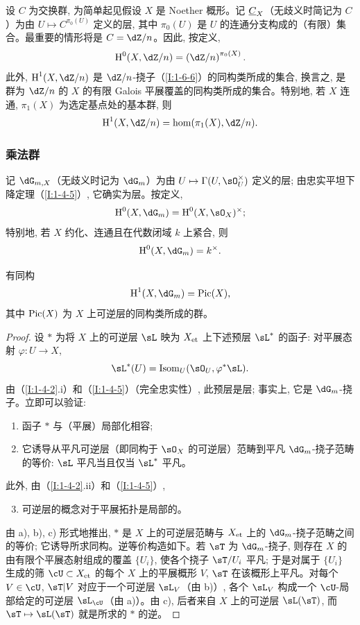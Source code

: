 设 $C$ 为交换群, 为简单起见假设 $X$ 是 Noether 概形。记 $\underline{C}_X$（无歧义时简记为 $C$）为由 $U\mapsto C^{\pi_0(U)}$ 定义的层, 其中 $\pi_0(U)$ 是 $U$ 的连通分支构成的（有限）集合。最重要的情形将是 $C=\dZ/n$。因此, 按定义,
\[
  \h^0(X,\dZ/n)=\left(\dZ/n\right)^{\pi_0(X)}\text{.}
\]
此外, $\h^1(X,\dZ/n)$ 是 $\dZ/n$-挠子（\ref{I:1-6-6}）的同构类所成的集合, 换言之, 是群为 $\dZ/n$ 的 $X$ 的有限 Galois 平展覆盖的同构类所成的集合。特别地, 若 $X$ 连通, $\pi_1(X)$ 为选定基点处的基本群, 则
\[
  \h^1(X,\dZ/n) = \hom(\pi_1(X),\dZ/n)\text{.}
\]

\subsubsection{乘法群}\label{I:2-2-2}

记 $\dG_{m,X}$（无歧义时记为 $\dG_m$）为由 $U\mapsto\Gamma(U,\sO_U^\times)$ 定义的层; 由忠实平坦下降定理（\ref{I:1-4-5}）, 它确实为层。按定义,
\[
  \h^0(X,\dG_m) = \h^0(X,\sO_X)^\times\text{;}
\]
特别地, 若 $X$ 约化、连通且在代数闭域 $k$ 上紧合, 则
\[
  \h^0(X,\dG_m) = k^\times\text{.}
\]

\begin{proposition}\label{I:2-2-3}
有同构
\[
  \h^1(X,\dG_m) = \pic(X)\text{,}
\]
其中 $\operatorname{Pic}(X)$ 为 $X$ 上可逆层的同构类所成的群。
\end{proposition}
\begin{proof}
设 $*$ 为将 $X$ 上的可逆层 $\sL$ 映为 ${X}_{\textnormal{et}}$ 上下述预层 $\sL^*$ 的函子: 对平展态射 $\varphi:U\to X$,
\[
  \sL^*(U)=\operatorname{Isom}_U(\sO_U,\varphi^*\sL)\text{.}
\]
由（\ref{I:1-4-2}.i）和（\ref{I:1-4-5}）（完全忠实性）, 此预层是层; 事实上, 它是 $\dG_m$-挠子。立即可以验证:
\begin{enumerate}[\indent a)]
  \item 函子 $*$ 与（平展）局部化相容;
  \item 它诱导从平凡可逆层（即同构于 $\sO_X$ 的可逆层）范畴到平凡 $\dG_m$-挠子范畴的等价: $\sL$ 平凡当且仅当 $\sL^*$ 平凡。
\end{enumerate}

此外, 由（\ref{I:1-4-2}.ii）和（\ref{I:1-4-5}）,
\begin{enumerate}[\indent a)]
\setcounter{enumi}{2}
  \item 可逆层的概念对于平展拓扑是局部的。
\end{enumerate}

由 a), b), c) 形式地推出, $*$ 是 $X$ 上的可逆层范畴与 ${X}_{\textnormal{et}}$ 上的 $\dG_m$-挠子范畴之间的等价; 它诱导所求同构。逆等价构造如下。若 $\sT$ 为 $\dG_m$-挠子, 则存在 $X$ 的由有限个平展态射组成的覆盖 $\{U_i\}$, 使各个挠子 $\sT/U_i$ 平凡; 于是对属于 $\{U_i\}$ 生成的筛 $\cU\subset\et X$ 的每个 $X$ 上的平展概形 $V$, $\sT$ 在该概形上平凡。对每个 $V\in\cU$, $\sT|V$ 对应于一个可逆层 $\sL_V$（由 b)）, 各个 $\sL_V$ 构成一个 $\cU$-局部给定的可逆层 $\sL_\cU$（由 a)）。由 c), 后者来自 $X$ 上的可逆层 $\sL(\sT)$, 而 $\sT\mapsto\sL(\sT)$ 就是所求的 $*$ 的逆。
\end{proof}

